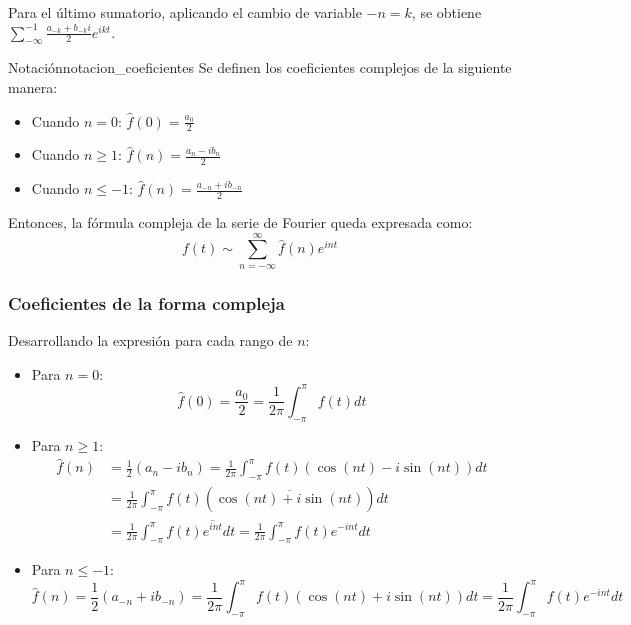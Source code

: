 Para el último sumatorio, aplicando el cambio de variable $-n=k$, se obtiene $\sum_{-\infty}^{-1} \frac{a_{-k} + b_{-k}i}{2} e^{ikt}$.

\begin{nota}{Notación}{notacion_coeficientes}
Se definen los coeficientes complejos de la siguiente manera:
\begin{itemize}
    \item Cuando $n = 0$: $\hat{f}(0) = \frac{a_0}{2}$
    \item Cuando $n \ge 1$: $\hat{f}(n) = \frac{a_n - i b_n}{2}$
    \item Cuando $n \le -1$: $\hat{f}(n) = \frac{a_{-n} + i b_{-n}}{2}$
\end{itemize}
\end{nota}

Entonces, la fórmula compleja de la serie de Fourier queda expresada como:
\begin{equation*}
    f(t) \sim \sum_{n=-\infty}^{\infty} \hat{f}(n) e^{int}
\end{equation*}

\subsubsection{Coeficientes de la forma compleja}

Desarrollando la expresión para cada rango de $n$:
\begin{itemize}
    \item Para $n = 0$:
    \begin{equation*}
        \hat{f}(0) = \frac{a_0}{2} = \frac{1}{2\pi} \int_{-\pi}^{\pi} f(t) dt
    \end{equation*}
    \item Para $n \ge 1$:
    \begin{align*}
        \hat{f}(n) &= \frac{1}{2}(a_n - ib_n) = \frac{1}{2\pi} \int_{-\pi}^{\pi} f(t) (\cos(nt) - i \sin(nt)) dt \\
        &= \frac{1}{2\pi} \int_{-\pi}^{\pi} f(t) (\overline{\cos(nt) + i \sin(nt)}) dt \\
        &= \frac{1}{2\pi} \int_{-\pi}^{\pi} f(t) \overline{e^{int}} dt = \frac{1}{2\pi} \int_{-\pi}^{\pi} f(t) e^{-int} dt
    \end{align*}
    \item Para $n \le -1$:
    \begin{equation*}
        \hat{f}(n) = \frac{1}{2}(a_{-n} + i b_{-n}) = \frac{1}{2\pi} \int_{-\pi}^{\pi} f(t) (\cos(nt) + i \sin(nt)) dt = \frac{1}{2\pi} \int_{-\pi}^{\pi} f(t) e^{-int} dt
    \end{equation*}
\end{itemize}

